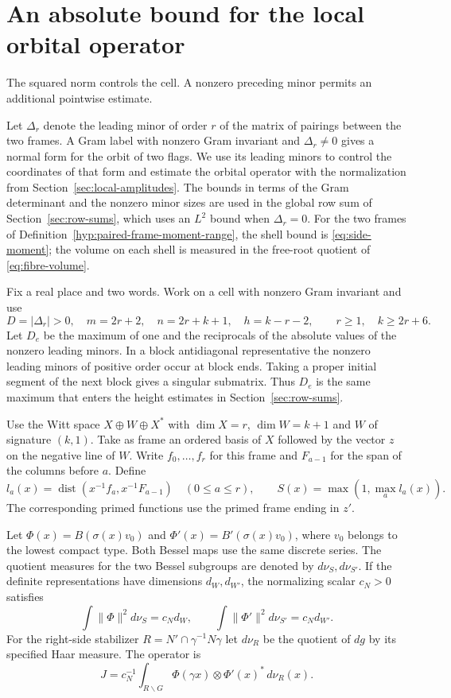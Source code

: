 \section{An absolute bound for the local orbital operator}
\label{sec:absolute}
\hypertarget{source-absolute-amplitude}{}

The squared norm controls the cell. A nonzero preceding minor permits an additional pointwise estimate.

Let \(\Delta_r\) denote the leading minor of order \(r\) of the matrix of pairings between the two frames. A Gram label with nonzero Gram invariant and \(\Delta_r\ne 0\) gives a normal form for the orbit of two flags. We use its leading minors to control the
coordinates of that form and estimate the orbital operator
with the normalization from Section~\ref{sec:local-amplitudes}.
The bounds in terms of the Gram determinant and the nonzero
minor sizes are used in the global row sum of
Section~\ref{sec:row-sums}, which uses an \(L^2\) bound
when \(\Delta_r=0\). For the two frames of Definition~\ref{hyp:paired-frame-moment-range}, the shell bound is \eqref{eq:side-moment}; the volume on each shell is measured in the free-root quotient of \eqref{eq:fibre-volume}.

Fix a real place and two words. Work on a cell with nonzero Gram
invariant and use
\[
 D=|\Delta_r|>0,\quad m=2r+2,\quad n=2r+k+1,\quad h=k-r-2,
 \qquad r\ge1,\quad k\ge2r+6.
\]
Let \(D_e\) be the maximum of one and the reciprocals of the
absolute values of the nonzero leading minors. In a block antidiagonal representative the
nonzero leading minors of positive order occur at block ends.
Taking a proper initial segment of the next block gives a
singular submatrix. Thus \(D_e\) is the same maximum that enters
the height estimates in Section~\ref{sec:row-sums}.

Use the Witt space \(X\oplus W\oplus X^*\) with
\(\dim X=r\), \(\dim W=k+1\) and \(W\) of signature \((k,1)\).
Take as frame an ordered basis of \(X\) followed by the vector
\(z\) on the negative line of \(W\). Write \(f_0,\ldots,f_r\) for this frame and \(F_{a-1}\) for the
span of the columns before \(a\). Define
\[
 l_a(x)=\operatorname{dist}(x^{-1}f_a,x^{-1}F_{a-1})
 \quad(0\le a\le r),\qquad S(x)=\max(1,\max_a l_a(x)).
\]
The corresponding primed functions use the primed frame ending in \(z'\).

Let \(\Phi(x)=B(\sigma(x)v_0)\) and \(\Phi'(x)=B'(\sigma(x)v_0)\),
where \(v_0\) belongs to the lowest compact type. Both Bessel
maps use the same discrete series. The quotient measures for the
two Bessel subgroups are denoted by \(d\nu_S,d\nu_{S'}\).
If the definite representations have dimensions \(d_W,d_{W'}\),
the normalizing scalar \(c_N>0\) satisfies
\[
 \int\|\Phi\|^2d\nu_S=c_Nd_W,\qquad
 \int\|\Phi'\|^2d\nu_{S'}=c_Nd_{W'}.
\]
For the right-side stabilizer
\(R=N'\cap\gamma^{-1}N\gamma\) let \(d\nu_R\) be the quotient
of \(dg\) by its specified Haar measure. The operator is
\[
 J=c_N^{-1}\int_{R\backslash G}
       \Phi(\gamma x)\otimes\Phi'(x)^*\,d\nu_R(x).
\]

